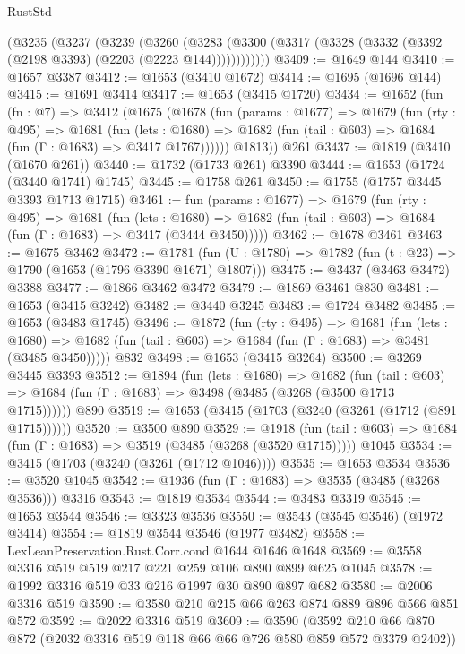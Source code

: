\begin{lexlean}{RustStd}
\begin{coremodule}
    (@3235
      (@3237
        (@3239
          (@3260
            (@3283 (@3300 (@3317 (@3328 (@3332 (@3392 (@2198 @3393) (@2203 (@2223 @144))))))))))))
@3409 := @1649 @144
@3410 := @1657 @3387
@3412 := @1653 (@3410 @1672)
@3414 := @1695 (@1696 @144)
@3415 := @1691 @3414
@3417 := @1653 (@3415 @1720)
@3434 := @1652
    (fun (fn : @7) =>
    @3412
      (@1675
        (@1678
          (fun (params : @1677) =>
          @1679
            (fun (rty : @495) =>
            @1681
              (fun (lets : @1680) =>
              @1682 (fun (tail : @603) => @1684 (fun (Γ : @1683) => @3417 @1767))))))
        @1813))
    @261
@3437 := @1819 (@3410 (@1670 @261))
@3440 := @1732 (@1733 @261) @3390
@3444 := @1653 (@1724 (@3440 @1741) @1745)
@3445 := @1758 @261
@3450 := @1755 (@1757 @3445 @3393 @1713 @1715)
@3461 := fun (params : @1677) =>
  @1679
    (fun (rty : @495) =>
    @1681
      (fun (lets : @1680) =>
      @1682 (fun (tail : @603) => @1684 (fun (Γ : @1683) => @3417 (@3444 @3450)))))
@3462 := @1678 @3461
@3463 := @1675 @3462
@3472 := @1781 (fun (U : @1780) => @1782 (fun (t : @23) => @1790 (@1653 (@1796 @3390 @1671) @1807)))
@3475 := @3437 (@3463 @3472) @3388
@3477 := @1866 @3462 @3472
@3479 := @1869 @3461 @830
@3481 := @1653 (@3415 @3242)
@3482 := @3440 @3245
@3483 := @1724 @3482
@3485 := @1653 (@3483 @1745)
@3496 := @1872
    (fun (rty : @495) =>
    @1681
      (fun (lets : @1680) =>
      @1682 (fun (tail : @603) => @1684 (fun (Γ : @1683) => @3481 (@3485 @3450)))))
    @832
@3498 := @1653 (@3415 @3264)
@3500 := @3269 @3445 @3393
@3512 := @1894
    (fun (lets : @1680) =>
    @1682
      (fun (tail : @603) => @1684 (fun (Γ : @1683) => @3498 (@3485 (@3268 (@3500 @1713 @1715))))))
    @890
@3519 := @1653 (@3415 (@1703 (@3240 (@3261 (@1712 (@891 @1715))))))
@3520 := @3500 @890
@3529 := @1918
    (fun (tail : @603) => @1684 (fun (Γ : @1683) => @3519 (@3485 (@3268 (@3520 @1715)))))
    @1045
@3534 := @3415 (@1703 (@3240 (@3261 (@1712 @1046))))
@3535 := @1653 @3534
@3536 := @3520 @1045
@3542 := @1936 (fun (Γ : @1683) => @3535 (@3485 (@3268 @3536))) @3316
@3543 := @1819 @3534
@3544 := @3483 @3319
@3545 := @1653 @3544
@3546 := @3323 @3536
@3550 := @3543 (@3545 @3546) (@1972 @3414)
@3554 := @1819 @3544 @3546 (@1977 @3482)
@3558 := LexLeanPreservation.Rust.Corr.cond @1644 @1646 @1648
@3569 := @3558 @3316 @519 @519 @217 @221 @259 @106 @890 @899 @625 @1045
@3578 := @1992 @3316 @519 @33 @216 @1997 @30 @890 @897 @682
@3580 := @2006 @3316 @519
@3590 := @3580 @210 @215 @66 @263 @874 @889 @896 @566 @851 @572
@3592 := @2022 @3316 @519
@3609 := @3590
    (@3592 @210 @66 @870 @872 (@2032 @3316 @519 @118 @66 @66 @726 @580 @859 @572 @3379 @2402))

\end{coremodule}
\end{lexlean}
